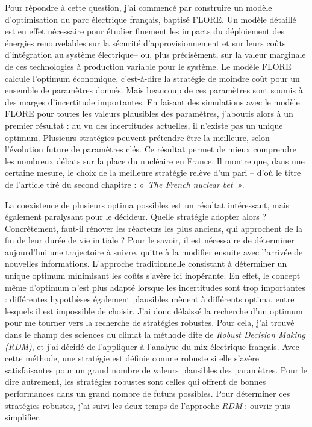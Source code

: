 Pour répondre à cette question, j'ai commencé par construire un modèle d'optimisation du parc électrique français, baptisé FLORE. Un modèle détaillé est en effet nécessaire pour étudier finement les impacts du déploiement des énergies renouvelables sur la sécurité d'approvisionnement et sur leurs coûts d'intégration au système électrique-- ou, plus précisément, sur la valeur marginale de ces technologies à production variable pour le système.
Le modèle FLORE calcule l'optimum économique, c'est-à-dire la stratégie de moindre coût pour un ensemble de paramètres donnés. Mais beaucoup de ces paramètres sont soumis à des marges d'incertitude importantes. En faisant des simulations avec le modèle FLORE pour toutes les valeurs plausibles des paramètres, j'aboutis alors à un premier résultat : au vu des incertitudes actuelles, il n'existe pas un unique optimum. Plusieurs stratégies peuvent prétendre être la meilleure, selon l'évolution future de paramètres clés.
Ce résultat permet de mieux comprendre les nombreux débats sur la place du nucléaire en France. Il montre que, dans une certaine mesure, le choix de la meilleure stratégie relève d'un pari -- d'où le titre de l'article tiré du second chapitre : «~\textit{The French nuclear bet~»}.


La coexistence de plusieurs optima possibles est un résultat intéressant, mais également paralysant pour le décideur. Quelle stratégie adopter alors ? Concrètement, faut-il rénover les réacteurs les plus anciens, qui approchent de la fin de leur durée de vie initiale ? Pour le savoir, il est nécessaire de déterminer aujourd'hui une trajectoire à suivre, quitte à la modifier ensuite avec l'arrivée de nouvelles informations.
L'approche traditionnelle consistant à déterminer un unique optimum minimisant les coûts s'avère ici inopérante. En effet, le concept même d’optimum n’est plus adapté lorsque les incertitudes sont trop importantes : différentes hypothèses également plausibles mènent à différents optima, entre lesquels il est impossible de choisir. 
J'ai donc délaissé la recherche d'un optimum pour me tourner vers la recherche de stratégies robustes. Pour cela, j'ai trouvé dans le champ des sciences du climat la méthode dite de \textit{Robust Decision Making (RDM)}, et j'ai décidé de l'appliquer à l'analyse du mix électrique français. Avec cette méthode, une stratégie est définie comme robuste si elle s'avère satisfaisantes pour un grand nombre de valeurs plausibles des paramètres. Pour le dire autrement, les stratégies robustes sont celles qui offrent de bonnes performances dans un grand nombre de futurs possibles. 
Pour déterminer ces stratégies robustes, j'ai suivi les deux temps de l'approche \textit{RDM} : ouvrir puis simplifier. 
	
